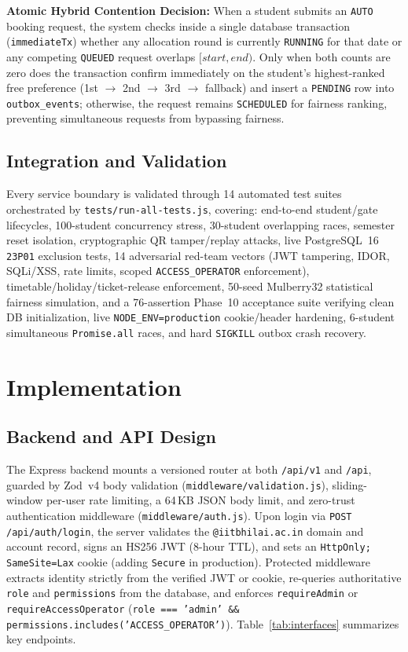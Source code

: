 \documentclass[manuscript,screen,review]{acmart}
\begin{document}
\textbf{Atomic Hybrid Contention Decision:} When a student submits an \texttt{AUTO} booking request, the system checks inside a single database transaction (\texttt{immediateTx}) whether any allocation round is currently \texttt{RUNNING} for that date or any competing \texttt{QUEUED} request overlaps $[start, end)$. Only when both counts are zero does the transaction confirm immediately on the student's highest-ranked free preference (1st $\rightarrow$ 2nd $\rightarrow$ 3rd $\rightarrow$ fallback) and insert a \texttt{PENDING} row into \texttt{outbox\_events}; otherwise, the request remains \texttt{SCHEDULED} for fairness ranking, preventing simultaneous requests from bypassing fairness.

\subsection{Integration and Validation}
Every service boundary is validated through 14 automated test suites orchestrated by \texttt{tests/run-all-tests.js}, covering: end-to-end student/gate lifecycles, 100-student concurrency stress, 30-student overlapping races, semester reset isolation, cryptographic QR tamper/replay attacks, live PostgreSQL~16 \texttt{23P01} exclusion tests, 14 adversarial red-team vectors (JWT tampering, IDOR, SQLi/XSS, rate limits, scoped \texttt{ACCESS\_OPERATOR} enforcement), timetable/holiday/ticket-release enforcement, 50-seed Mulberry32 statistical fairness simulation, and a 76-assertion Phase~10 acceptance suite verifying clean DB initialization, live \texttt{NODE\_ENV=production} cookie/header hardening, 6-student simultaneous \texttt{Promise.all} races, and hard \texttt{SIGKILL} outbox crash recovery.

\section{Implementation}
\label{sec:implementation}

\subsection{Backend and API Design}
The Express backend mounts a versioned router at both \texttt{/api/v1} and \texttt{/api}, guarded by Zod~v4 body validation (\texttt{middleware/validation.js}), sliding-window per-user rate limiting, a 64\,KB JSON body limit, and zero-trust authentication middleware (\texttt{middleware/auth.js}). Upon login via \texttt{POST /api/auth/login}, the server validates the \texttt{@iitbhilai.ac.in} domain and account record, signs an HS256 JWT (8-hour TTL), and sets an \texttt{HttpOnly; SameSite=Lax} cookie (adding \texttt{Secure} in production). Protected middleware extracts identity strictly from the verified JWT or cookie, re-queries authoritative \texttt{role} and \texttt{permissions} from the database, and enforces \texttt{requireAdmin} or \texttt{requireAccessOperator} (\texttt{role === 'admin' \&\& permissions.includes('ACCESS\_OPERATOR')}). Table~\ref{tab:interfaces} summarizes key endpoints.
\end{document}
